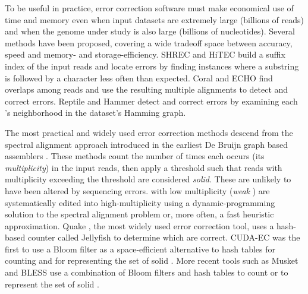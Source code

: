 \documentclass[10pt]{article}
\begin{document}
To be useful in practice, error correction software must make economical use of time and memory even when input datasets are extremely large (billions of reads) and when the genome under study is also large (billions of nucleotides).
Several methods have been proposed, covering a wide tradeoff space between accuracy, speed and memory- and storage-efficiency.
SHREC \cite{schroder2009shrec} and HiTEC \cite{ilie2011hitec} build a suffix index of the input reads and locate errors by finding instances where a substring is followed by a character less often than expected.
Coral \cite{salmela2011correcting} and ECHO \cite{kao2011echo} find overlaps among reads and use the resulting multiple alignments to detect and correct errors.
Reptile \cite{yang2010reptile} and Hammer \cite{medvedev2011error} detect and correct errors by examining each \kmer's neighborhood in the dataset's \kmer Hamming graph.


The most practical and widely used error correction methods descend from the spectral alignment approach introduced in the earliest De Bruijn graph based assemblers \cite{pevzner2001eulerian, chaisson2004fragment}.
These methods count the number of times each \kmer occurs (its \emph{multiplicity}) in the input reads, then apply a threshold such that reads with multiplicity exceeding the threshold are considered \emph{solid}.
These \kmers are unlikely to have been altered by sequencing errors.
\kmers with low multiplicity (\emph{weak} \kmers) are systematically edited into high-multiplicity \kmers using a dynamic-programming solution to the spectral alignment problem \cite{pevzner2001eulerian, chaisson2004fragment} or, more often, a fast heuristic approximation.
Quake \cite{kelley2010quake}, the most widely used error correction tool, uses a hash-based \kmer counter called Jellyfish \cite{marccais2011fast} to determine which \kmers are correct.
CUDA-EC \cite{shi2010parallel} was the first to use a Bloom filter as a space-efficient alternative to hash tables for counting \kmers and for representing the set of solid \kmers.
More recent tools such as Musket \cite{liu2013musket} and BLESS \cite{heo2014bless} use a combination of Bloom filters and hash tables to count \kmers or to represent the set of solid \kmers.
\end{document}
